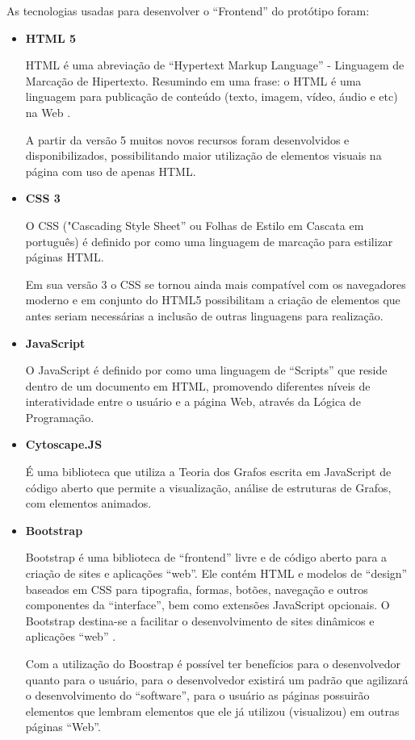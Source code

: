 As tecnologias usadas para desenvolver o “Frontend” do protótipo foram:
\begin{itemize}
    \item[] \textbf{HTML 5}   
    
    \begin{citacao} 
    HTML é uma abreviação de “Hypertext Markup Language” - Linguagem de Marcação de Hipertexto. Resumindo em uma frase: o HTML é uma linguagem para publicação de conteúdo (texto, imagem, vídeo, áudio e etc) na Web \cite{ferreiraHTML}.
    
    \end{citacao}     
    A partir da versão 5 muitos novos recursos foram desenvolvidos e disponibilizados, possibilitando maior utilização de elementos visuais na página com uso de apenas HTML.
       
    \item[] \textbf{CSS 3}
    
     O CSS ("Cascading Style Sheet” ou Folhas de Estilo em Cascata em português) é definido por  como uma linguagem de marcação para estilizar páginas HTML.

Em sua versão 3 o CSS se tornou ainda mais compatível com os navegadores moderno e em conjunto do HTML5 possibilitam a criação de elementos que antes seriam necessárias a inclusão de outras linguagens para realização.
   
   
    \item[] \textbf{JavaScript }
      
   O JavaScript é definido por  como uma linguagem de “Scripts” que reside dentro de um documento em HTML, promovendo diferentes níveis de interatividade entre o usuário e a página Web, através da Lógica de Programação.

   
    \item[] \textbf{Cytoscape.JS}
    
    É uma biblioteca que utiliza a Teoria dos Grafos escrita em JavaScript de código aberto que permite a visualização, análise de estruturas de Grafos, com elementos animados.
  
   
    \item[] \textbf{Bootstrap}
    \begin{citacao} 
     Bootstrap é uma biblioteca de “frontend” livre e de código aberto para a criação de sites e aplicações “web”. Ele contém HTML e modelos de “design” baseados em CSS para tipografia, formas, botões, navegação e outros componentes da “interface”, bem como extensões JavaScript opcionais. O Bootstrap destina-se a facilitar o desenvolvimento de sites dinâmicos e aplicações “web” \cite{portalgsti2020}.
    
    \end{citacao}    
    
   Com a utilização do Boostrap é possível ter benefícios para o desenvolvedor quanto para o usuário, para o desenvolvedor existirá um padrão que agilizará o desenvolvimento do “software”, para o usuário as páginas possuirão elementos que lembram elementos que ele já utilizou (visualizou) em outras páginas “Web”.
   
\end{itemize}

